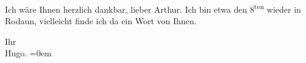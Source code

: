 \pstart
           Ich wäre Ihnen herzlich dankbar, lieber Arthur. Ich bin etwa den 8\textsuperscript{ten} wieder in Rodaun, vielleicht finde ich da
               ein Wort von Ihnen.\pend
           
\pstart
           Ihr{\\[\baselineskip]}\spacefill\mbox{Hugo.}\pend
           \leftskip=0em{}\endnumbering{}  \newcommand{\dateiname}{L02112}\newcommand{\titel}{Hugo von Hofmannsthal an Arthur Schnitzler, 3. 1. 1913}\newcommand{\editorInnen}{Martin Anton Müller und Gerd-Hermann Susen}
